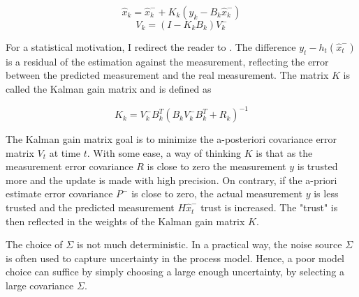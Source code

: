 \documentclass[mscthesis]{usiinfthesis}
\begin{document}

\[
\hat{x}_k = \hat{x}_k^- + K_k (y_k - B_k \hat{x}_k^-)
\]
\[
V_k = (I-K_k B_k)V_k^-
\]

\noindent For a statistical motivation, I redirect the reader to \citet{paper:Maybeck79}. The difference $y_t - h_t(\hat{x}_t^-)$ is a residual of the estimation against the measurement, reflecting the error between the predicted measurement and the real measurement. The matrix $K$ is called the Kalman gain matrix and is defined as 


\[
K_k = V_k^- B^T_k (B_k V_k^- B^T_k + R_k)^{-1}
\]




\noindent The Kalman gain matrix goal is to minimize the a-posteriori covariance error matrix $V_t$ at time $t$. With some ease, a way of thinking $K$ is that as the measurement error covariance $R$ is close to zero the measurement $y$ is trusted more and the update is made with high precision. On contrary, if the a-priori estimate error covariance $P^-$ is close to zero, the actual measurement $y$ is less trusted and the predicted measurement $H\hat{x}_t^-$ trust is increased. The "trust" is then reflected in the weights of the Kalman gain matrix $K$.



The choice of $\Sigma$ is not much deterministic. In a practical way, the noise source $\Sigma$ is often used to capture uncertainty in the process model. Hence, a poor model choice can suffice by simply choosing a large enough uncertainty, by selecting a large covariance $\Sigma$. 
\end{document}
